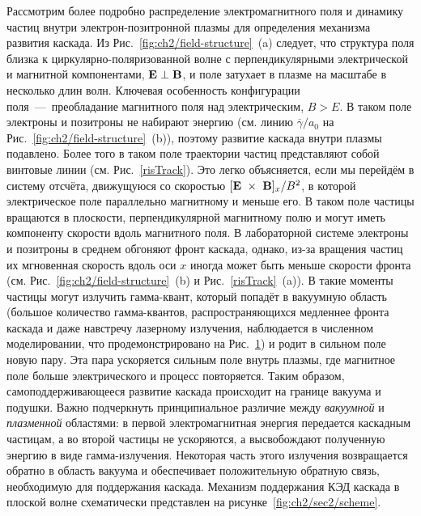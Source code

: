 Рассмотрим более подробно распределение электромагнитного поля и динамику частиц внутри электрон-позитронной плазмы для определения механизма развития каскада. 
Из Рис.~\ref{fig:ch2/field-structure}~(a) следует, что структура поля близка к циркулярно-поляризованной волне с перпендикулярными электрической и магнитной компонентами, $\vb{E \perp B}$, и поле затухает в плазме на масштабе в несколько длин волн. 
Ключевая особенность конфигурации поля~---~преобладание магнитного поля над электрическим, $B > E$.
В таком поле электроны и позитроны не набирают энергию (см. линию $\overline{\gamma} / a_0$ на  Рис.~\ref{fig:ch2/field-structure}~(b)), поэтому развитие каскада внутри плазмы подавлено.
Более того в таком поле траектории частиц представляют собой винтовые линии (см. Рис.~\ref{risTrack}). 
Это легко объясняется, если мы перейдём в систему отсчёта, движущуюся со скоростью $[\vb{E}~\times~\vb{B}]_x / B^2$, в которой электрическое поле параллельно магнитному и меньше его. 
В таком поле частицы вращаются в плоскости, перпендикулярной магнитному полю и могут иметь компоненту скорости вдоль магнитного поля. 
В лабораторной системе электроны и позитроны в среднем обгоняют фронт каскада, однако, из-за вращения частиц их мгновенная скорость вдоль оси $x$ иногда может быть меньше скорости фронта (см.  Рис.~\ref{fig:ch2/field-structure}~(b) и Рис.~\ref{risTrack}~(a)). 
В такие моменты частицы могут излучить гамма-квант, который попадёт в вакуумную область (большое количество гамма-квантов, распространяющихся медленнее фронта каскада и даже навстречу лазерному излучения, наблюдается в численном моделировании, что продемонстрировано на Рис.~\ref{gamma10}) и родит в сильном поле новую пару. 
Эта пара ускоряется сильным поле внутрь плазмы, где магнитное поле больше электрического и процесс повторяется.
Таким образом, самоподдерживающееся развитие каскада происходит на границе вакуума и подушки.
Важно подчеркнуть принципиальное различие между \textit{вакуумной} и \textit{плазменной} областями: в первой электромагнитная энергия передается каскадным частицам, а во второй частицы не ускоряются, а высвобождают полученную энергию в виде гамма-излучения.
Некоторая часть этого излучения возвращается обратно в область вакуума и обеспечивает положительную обратную связь, необходимую для поддержания каскада.
Механизм поддержания КЭД каскада в плоской волне схематически представлен на рисунке~\ref{fig:ch2/sec2/scheme}.

\begin{figure}[h!]
	\caption{\label{gamma10}  }
\end{figure}


